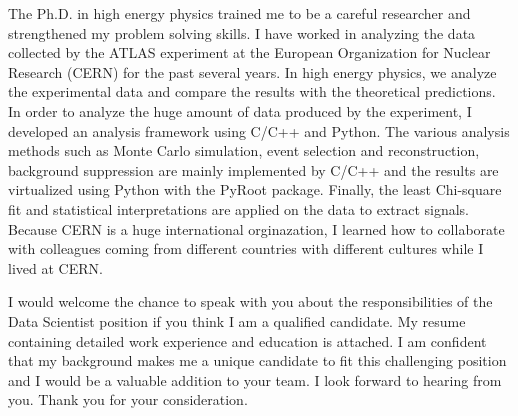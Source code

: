 \documentclass[11pt,letterpaper]{moderncv}   %
\newcommand{\JobPositionName}{Data Scientist}
\begin{document}
The Ph.D. in high energy physics trained me to be a careful researcher and strengthened my problem solving skills.
I have worked in analyzing the data collected by the ATLAS experiment at the European Organization for Nuclear Research (CERN) for the past several years.
In high energy physics, we analyze the experimental data and compare the results with the theoretical predictions.
In order to analyze the huge amount of data produced by the experiment, I developed an analysis framework using C/C++ and Python.
The various analysis methods such as Monte Carlo simulation, event selection and reconstruction, background suppression are mainly implemented by C/C++ and the results are virtualized using Python with the PyRoot package.
Finally, the least Chi-square fit and statistical interpretations are applied on the data to extract signals.
Because CERN is a huge international orginazation, I learned how to collaborate with colleagues coming from different countries with different cultures while I lived at CERN.


I would welcome the chance to speak with you about the responsibilities of the \JobPositionName{} position if you think I am a qualified candidate.
My resume containing detailed work experience and education is attached.
I am confident that my background makes me a unique candidate to fit this challenging position and I would be a valuable addition to your team.
I look forward to hearing from you.
Thank you for your consideration.


\vspace{0.01cm}

\makeletterclosing
\end{document}
